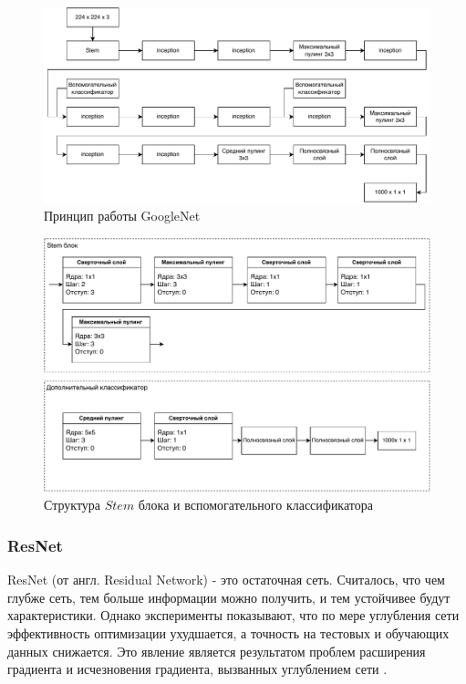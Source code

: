 \begin{figure}[hbtp]
	\centering
	\includegraphics[width=\textwidth]{img/googlenet.pdf}
	\caption{Принцип работы GoogleNet}
	\label{fig:googlenet}
\end{figure}

\begin{figure}[hbtp]
	\centering
	\includegraphics[width=\textwidth]{img/stem_aux.pdf}
	\caption{Структура $Stem$ блока и вспомогательного классификатора}
	\label{fig:stem_aux}
\end{figure}
\clearpage

\subsubsection{ResNet}
ResNet (от англ. Residual Network) - это остаточная сеть.  Считалось, что чем глубже сеть, тем больше информации можно получить, и тем устойчивее будут характеристики. Однако эксперименты показывают, что по мере углубления сети эффективность оптимизации ухудшается, а точность на тестовых и обучающих данных снижается. Это явление является результатом проблем расширения градиента и исчезновения градиента, вызванных углублением сети \cite{gradient_problem}.

